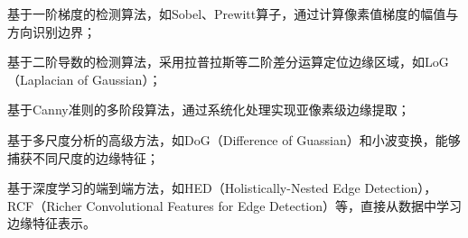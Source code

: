 \documentclass[a4paper, UTF8, fontsize=12pt]{ctexart} %
\numberwithin{equation}{section} %
\begin{document}
\begin{halfparlist}
    \item 基于一阶梯度的检测算法，如Sobel、Prewitt算子，通过计算像素值梯度的幅值与方向识别边界；

    \item 基于二阶导数的检测算法，采用拉普拉斯等二阶差分运算定位边缘区域，如LoG（Laplacian of Gaussian）\cite{kong2013generalized}；

    \item 基于Canny准则的多阶段算法，通过系统化处理实现亚像素级边缘提取；

    \item 基于多尺度分析的高级方法，如DoG（Difference of Guassian）\cite{chen2021joint}和小波变换，能够捕获不同尺度的边缘特征；

    \item 基于深度学习的端到端方法，如HED（Holistically-Nested Edge Detection），RCF（Richer Convolutional Features for Edge Detection）等\cite{xie2015holistically,liu2017richer}，直接从数据中学习边缘特征表示。
\end{halfparlist}
\end{document}
